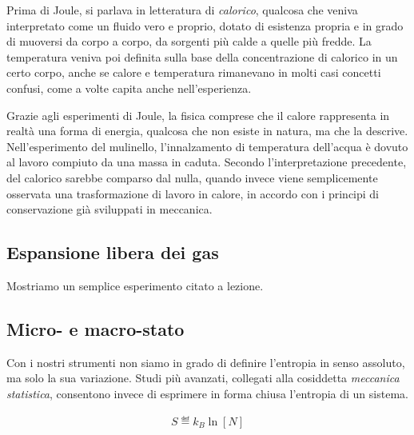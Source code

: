 Prima di Joule, si parlava in letteratura di \textit{calorico},
qualcosa che veniva interpretato come un fluido vero e proprio,
dotato di esistenza propria e in grado di muoversi da corpo a
corpo, da sorgenti più calde a quelle più fredde. La temperatura
veniva poi definita sulla base della concentrazione di calorico
in un certo corpo, anche se calore e temperatura rimanevano in
molti casi concetti confusi, come a volte capita anche nell'esperienza.

Grazie agli esperimenti di Joule, la fisica comprese che il calore
rappresenta in realtà una forma di energia, qualcosa che
non esiste in natura, ma che la descrive. Nell'esperimento del
mulinello, l'innalzamento di temperatura dell'acqua è dovuto al
lavoro compiuto da una massa in caduta. Secondo l'interpretazione
precedente, del calorico sarebbe comparso dal nulla, quando invece
viene semplicemente osservata una trasformazione di lavoro in calore,
in accordo con i principi di conservazione già sviluppati in meccanica.


\subsection{Espansione libera dei gas}
Mostriamo un semplice esperimento citato a lezione.


\subsection{Micro- e macro-stato}
Con i nostri strumenti non siamo in grado di definire l'entropia in
senso assoluto, ma solo la sua variazione. Studi più avanzati,
collegati alla cosiddetta \textit{meccanica statistica}, consentono
invece di esprimere in forma chiusa l'entropia di un sistema.

\begin{align}
    S \eqdef k_B \ln [N]\label{entropia_meccanica_statistica}
\end{align}

